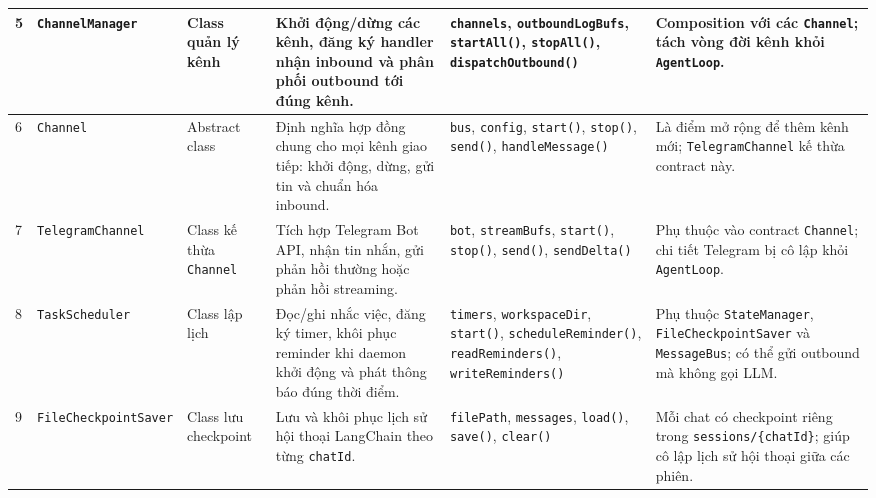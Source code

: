 \begin{longtable}{|p{0.55cm}|p{2.25cm}|p{1.95cm}|p{3.2cm}|p{3.0cm}|p{3.05cm}|}
\hline
5 & \texttt{Channel}\newline\texttt{Manager} & Class quản lý kênh & Khởi động/dừng các kênh, đăng ký handler nhận inbound và phân phối outbound tới đúng kênh. & \texttt{channels}, \texttt{outbound}\newline\texttt{LogBufs}, \texttt{startAll()}, \texttt{stopAll()}, \texttt{dispatch}\newline\texttt{Outbound()} & Composition với các \texttt{Channel}; tách vòng đời kênh khỏi \texttt{AgentLoop}. \\
\hline
6 & \texttt{Channel} & Abstract class & Định nghĩa hợp đồng chung cho mọi kênh giao tiếp: khởi động, dừng, gửi tin và chuẩn hóa inbound. & \texttt{bus}, \texttt{config}, \texttt{start()}, \texttt{stop()}, \texttt{send()}, \texttt{handleMessage()} & Là điểm mở rộng để thêm kênh mới; \texttt{TelegramChannel} kế thừa contract này. \\
\hline
7 & \texttt{Telegram}\newline\texttt{Channel} & Class kế thừa \texttt{Channel} & Tích hợp Telegram Bot API, nhận tin nhắn, gửi phản hồi thường hoặc phản hồi streaming. & \texttt{bot}, \texttt{streamBufs}, \texttt{start()}, \texttt{stop()}, \texttt{send()}, \texttt{sendDelta()} & Phụ thuộc vào contract \texttt{Channel}; chi tiết Telegram bị cô lập khỏi \texttt{AgentLoop}. \\
\hline
8 & \texttt{Task}\newline\texttt{Scheduler} & Class lập lịch & Đọc/ghi nhắc việc, đăng ký timer, khôi phục reminder khi daemon khởi động và phát thông báo đúng thời điểm. & \texttt{timers}, \texttt{workspaceDir}, \texttt{start()}, \texttt{schedule}\newline\texttt{Reminder()}, \texttt{readReminders()}, \texttt{writeReminders()} & Phụ thuộc \texttt{StateManager}, \texttt{FileCheckpoint}\newline\texttt{Saver} và \texttt{MessageBus}; có thể gửi outbound mà không gọi LLM. \\
\hline
9 & \texttt{File}\newline\texttt{Checkpoint}\newline\texttt{Saver} & Class lưu checkpoint & Lưu và khôi phục lịch sử hội thoại LangChain theo từng \texttt{chatId}. & \texttt{filePath}, \texttt{messages}, \texttt{load()}, \texttt{save()}, \texttt{clear()} & Mỗi chat có checkpoint riêng trong \texttt{sessions/}\newline\texttt{\{chatId\}}; giúp cô lập lịch sử hội thoại giữa các phiên. \\

\end{longtable}
